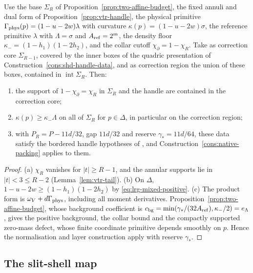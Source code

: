 

\begin{proposition}\label{prop:two-handle}
Use the base $\Sigma_R$ of Proposition~\ref{prop:two-affine-budget}, the fixed annuli and dual form of
Proposition~\ref{prop:vtr-handle}, the physical primitive $\Gamma_{\rm phys}(p)=(1-u-2w)\lambda$ with curvature
$\kappa(p)=(1-u-2w)\sigma$, the reference primitive $\lambda$ with $\Lambda=\sigma$ and $A_{\rm ref}=2^m$, the density floor
$\kappa_-=(1-h_1)(1-2h_2)$, and the collar cutoff $\chi_\partial=1-\chi_R$. Take as correction core $\Sigma_{R-1}$, covered by
the inner boxes of the quadric presentation of Construction~\ref{cons:shd-handle-data}, and as correction region the
union of these boxes, contained in $\operatorname{int}\Sigma_R$. Then:
\begin{enumerate}[label=(\alph*)]
\item the support of $1-\chi_\partial=\chi_R$ in $\Sigma_R$ and the handle are contained in the correction core;
\item $\kappa(p)\ge\kappa_-\Lambda$ on all of $\Sigma_R$ for $p\in\Delta$, in particular on the correction region;
\item with $P_R=P-11d/32$, gap $11d/32$ and reserve $\gamma_*=11d/64$, these data satisfy the bordered handle hypotheses
 of , and Construction~\ref{cons:native-packing} applies to them.
\end{enumerate}
\end{proposition}

\begin{proof}
(a) $\chi_R$ vanishes for $|t|\ge R-1$, and the annular supports lie in $|t|<3\le R-2$ (Lemma~\ref{lem:vtr-tail}).
(b) On $\Delta$, $1-u-2w\ge(1-h_1)(1-2h_2)$ by \eqref{eq:lrg-mixed-positive}. (c) The product form is
$\omega_V+d\Gamma_{\rm phys}$, including all moment derivatives. Proposition~\ref{prop:two-affine-budget}, whose background
coefficient is $c_{\rm bg}=\min(\gamma_*/(32A_{\rm ref}),\kappa_-/2)=e_\Lambda$, gives the positive background, the collar bound
and the compactly supported zero-mass defect, whose finite coordinate primitive depends smoothly on $p$. Hence the
normalisation and layer construction apply with reserve $\gamma_*$.
\end{proof}

\subsection{The slit-shell map}\label{sec:two-slit}

